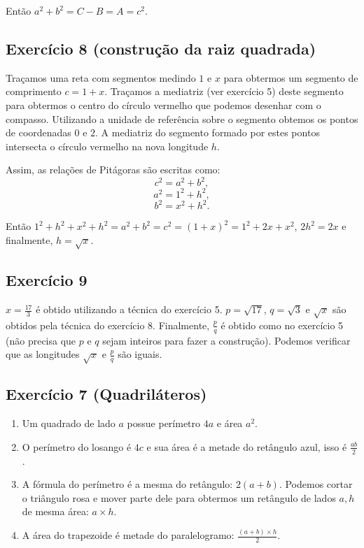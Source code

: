 Então $a^2 + b^2 = C - B = A = c^2$.

\subsection*{Exercício 8 (construção da raiz quadrada)}

Traçamos uma reta com segmentos medindo $1$ e $x$ para obtermos um segmento de
comprimento $c = 1 + x$. Traçamos a mediatriz (ver exercício 5) deste segmento
para obtermos o centro do círculo vermelho que podemos desenhar com o compasso.
Utilizando a unidade de referência sobre o segmento obtemos os pontos de
coordenadas $0$ e $2$. A mediatriz do segmento formado por estes pontos
intersecta o círculo vermelho na nova longitude $h$.

Assim, as relações de Pitágoras são escritas como:
$$c^2 = a^2 + b^2,$$
$$a^2 = 1^2 + h^2,$$
$$b^2 = x^2 + h^2.$$

Então
${1^2+h^2 + x^2 + h^2} = a^2 + b^2 = c^2 = {(1+x)}^2 = 1^2+2x+x^2$,
$2h^2 = 2x$ e finalmente, $h = \sqrt{x}$.

\subsection*{Exercício 9}

$x = \frac{17}{3}$ é obtido utilizando a técnica do exercício 5.
$p = \sqrt{17}$, $q=\sqrt{3}$ e $\sqrt{x}$ são obtidos pela técnica do
exercício 8. Finalmente, $\frac{p}{q}$ é obtido como no exercício 5 (não precisa
que $p$ e $q$ sejam inteiros para fazer a construção). Podemos verificar que as
longitudes $\sqrt{x}$ e $\frac{p}{q}$ são iguais.

\subsection*{Exercício 7 (Quadriláteros)}

\begin{enumerate}
\item Um quadrado de lado $a$ possue perímetro $4a$ e área $a^2$. 
\item O perímetro do losango é $4c$ e
  sua área é a metade do retângulo azul, isso é $\frac{ab}{2}$.
\item A fórmula do perímetro é a mesma do retângulo: $2{(a+b)}$.
  Podemos cortar o triângulo rosa e mover parte dele para obtermos um
  retângulo de lados $a,h$ de mesma área: $a \times h$.
\item A área do trapezoide é metade do paralelogramo:
  $\frac{{(a+b)} \times h}{2}$.
\end{enumerate}

